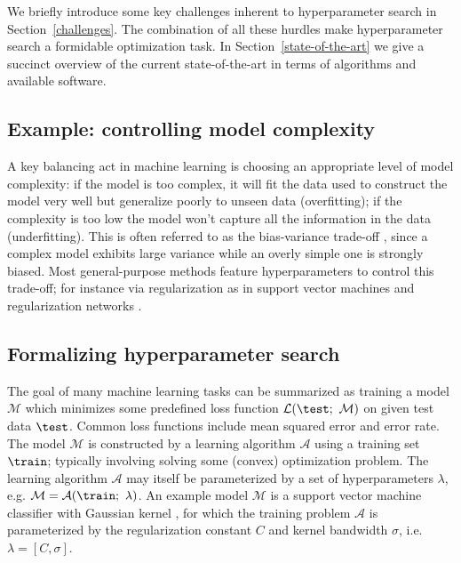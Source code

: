 We briefly introduce some key challenges inherent to hyperparameter search in Section~\ref{challenges}. The combination of all these hurdles make hyperparameter search a formidable optimization task. In Section~\ref{state-of-the-art} we give a succinct overview of the current state-of-the-art in terms of algorithms and available software.

\subsection{Example: controlling model complexity}
A key balancing act in machine learning is choosing an appropriate level of model complexity: if the model is too complex, it will fit the data used to construct the model very well but generalize poorly to unseen data (overfitting); if the complexity is too low the model won't capture all the information in the data (underfitting). This is often referred to as the bias-variance trade-off \citep{geman1992neural, cucker2002best}, since a complex model exhibits large variance while an overly simple one is strongly biased. Most general-purpose methods feature hyperparameters to control this trade-off; for instance via regularization as in support vector machines and regularization networks \citep{evgeniou2000regularization,hastie2004entire}.

\subsection{Formalizing hyperparameter search}
The goal of many machine learning tasks can be summarized as training a model $\mathcal{M}$ which minimizes some predefined loss function $\mathcal{L}(\test;\ \mathcal{M})$ on given test data $\test$. Common loss functions include mean squared error and error rate. The model $\mathcal{M}$ is constructed by a learning algorithm $\mathcal{A}$ using a training set $\train$; typically involving solving some (convex) optimization problem. The learning algorithm $\mathcal{A}$ may itself be parameterized by a set of hyperparameters $\lambda$, e.g. $\mathcal{M} = \mathcal{A}(\train;\ \lambda)$. An example model $\mathcal{M}$ is a support vector machine classifier with Gaussian kernel \citep{scholkopf2002learning}, for which the training problem $\mathcal{A}$ is parameterized by the regularization constant $C$ and kernel bandwidth $\sigma$, i.e. $\lambda = [C,\sigma]$.

